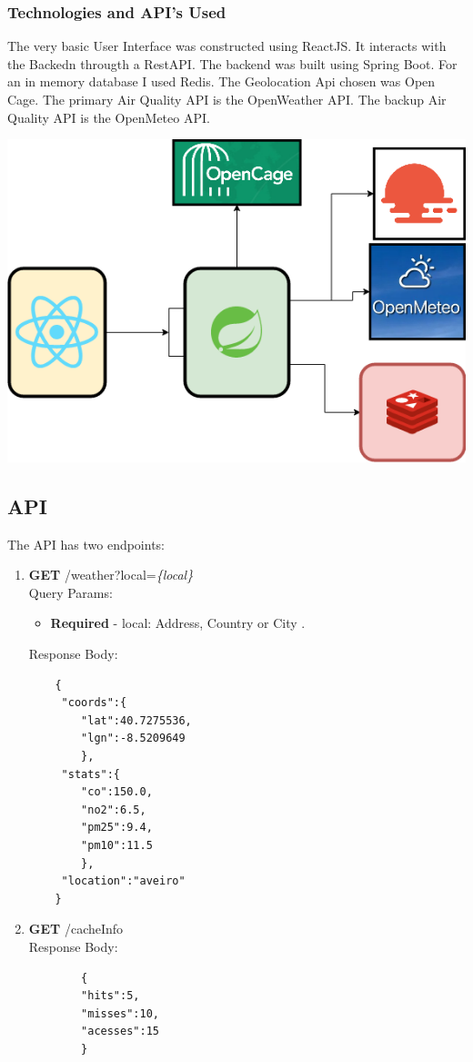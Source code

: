 \documentclass[12pt]{article}
\begin{document}
\subsubsection{Technologies and API's Used}

The very basic User Interface was constructed using ReactJS. It interacts with the Backedn througth a RestAPI. The backend was built using Spring Boot. For an in memory database I used Redis. The Geolocation Api chosen was Open Cage. The primary Air Quality API is the OpenWeather API. The backup Air Quality API is the OpenMeteo API.

\includegraphics[scale=.4]{TechFrameworks.png}



\subsection{API}

The API has two endpoints:

\begin{enumerate}
	
	\item \textbf{GET} /weather?local=\textit{\{local\}} \\
	Query Params: 
	\begin{itemize}
			\item \textbf{Required} - local: Address, Country or City .
	\end{itemize}
		
	
	Response Body: \\ 
	\begin{lstlisting}
	{
	 "coords":{
	 	"lat":40.7275536,
	 	"lgn":-8.5209649
	 	},
	 "stats":{
	 	"co":150.0,
	 	"no2":6.5,
	 	"pm25":9.4,
	 	"pm10":11.5
	 	},
	 "location":"aveiro"
	}
	\end{lstlisting}
	
	
	\item \textbf{GET} /cacheInfo\\
	Response Body: \\
	\begin{lstlisting}
		{
		"hits":5,
		"misses":10,
		"acesses":15
		}
		
	\end{lstlisting}

\end{enumerate}
\end{document}
